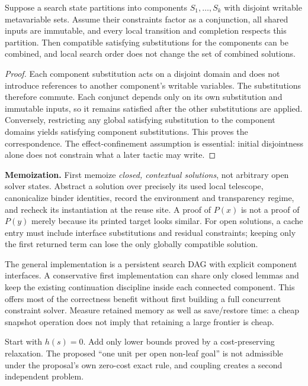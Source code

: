 \begin{proposition}
Suppose a search state partitions into components $S_1,\ldots,S_k$ with disjoint writable metavariable sets. Assume their constraints factor as a conjunction, all shared inputs are immutable, and every local transition and completion respects this partition. Then compatible satisfying substitutions for the components can be combined, and local search order does not change the set of combined solutions.
\end{proposition}
\begin{proof}
Each component substitution acts on a disjoint domain and does not introduce references to another component's writable variables. The substitutions therefore commute. Each conjunct depends only on its own substitution and immutable inputs, so it remains satisfied after the other substitutions are applied. Conversely, restricting any global satisfying substitution to the component domains yields satisfying component substitutions. This proves the correspondence. The effect-confinement assumption is essential: initial disjointness alone does not constrain what a later tactic may write.
\end{proof}

\textbf{Memoization.} First memoize \emph{closed, contextual solutions}, not arbitrary open solver states. Abstract a solution over precisely its used local telescope, canonicalize binder identities, record the environment and transparency regime, and recheck its instantiation at the reuse site. A proof of $P(x)$ is not a proof of $P(y)$ merely because its printed target looks similar. For open solutions, a cache entry must include interface substitutions and residual constraints; keeping only the first returned term can lose the only globally compatible solution.

The general implementation is a persistent search DAG with explicit component interfaces. A conservative first implementation can share only closed lemmas and keep the existing continuation discipline inside each connected component. This offers most of the correctness benefit without first building a full concurrent constraint solver. Measure retained memory as well as save/restore time: a cheap snapshot operation does not imply that retaining a large frontier is cheap.

\ans Start with $h(s)=0$. Add only lower bounds proved by a cost-preserving relaxation. The proposed ``one unit per open non-leaf goal'' is not admissible under the proposal's own zero-cost exact rule, and coupling creates a second independent problem.

